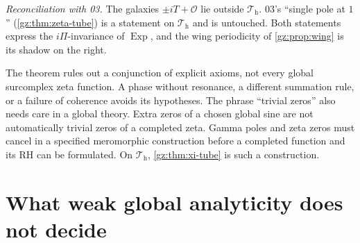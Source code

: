 \documentclass[11pt,a4paper]{article}
\numberwithin{equation}{section}
\theoremstyle{definition}
\theoremstyle{remark}
\newcommand{\OO}{\mathcal O}
\newcommand{\Exp}{\operatorname{Exp}}
\newcommand{\Th}{\mathcal T_{\mathrm h}}
\newcommand{\src}[1]{\textup{[#1]}}
\begin{document}
\emph{Reconciliation with 03.} The galaxies $\pm iT+\OO$ lie outside $\Th$.
03's ``single pole at $1$'' (\cref{gz:thm:zeta-tube}) is a statement on
$\Th$ and is untouched. Both statements express the $i\Pi$-invariance of
$\Exp$, and the wing periodicity of \cref{gz:prop:wing} is its shadow on the
right.

\begin{remark}[Scope \src{06}]\label{gz:rem:resonance-scope}
The theorem rules out a conjunction of explicit axioms, not every global
surcomplex zeta function. A phase without resonance, a different summation
rule, or a failure of coherence avoids its hypotheses. The phrase
``trivial zeros'' also needs care in a global theory. Extra zeros of a chosen
global sine are not automatically trivial zeros of a completed zeta. Gamma
poles and zeta zeros must cancel in a specified meromorphic construction
before a completed function and its RH can be formulated. On $\Th$,
\cref{gz:thm:xi-tube} is such a construction.
\end{remark}

\section{What weak global analyticity does not decide}\label{gz:sec:weak}
\end{document}
